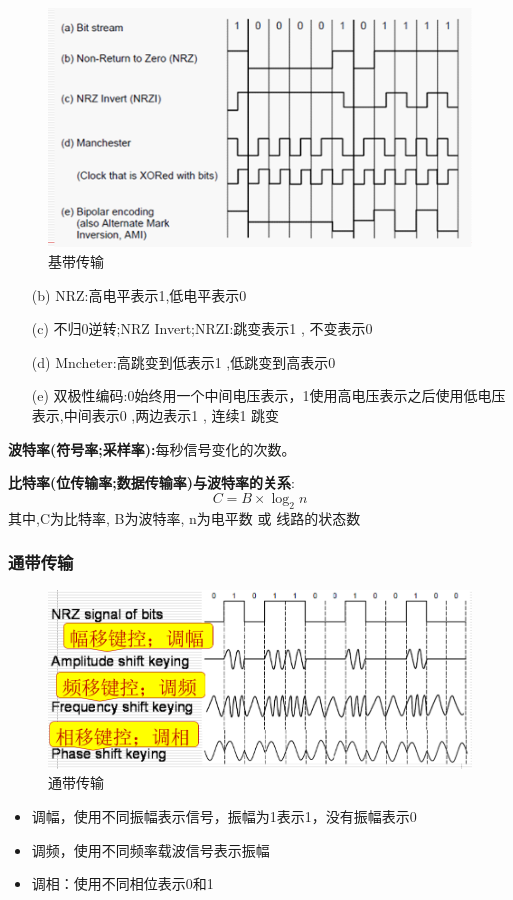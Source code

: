 \documentclass[UTF8,a4paper]{ctexart}
\begin{document}
  \begin{figure}[H]
    \centering
    \includegraphics[scale = 0.3]{assets/jisuanjiwangluo_cc3d9.png}
    \caption{基带传输}
  \end{figure}
  \begin{itemize}
    \item [(b)] NRZ:高电平表示1,低电平表示0
    \item [(c)] 不归0逆转;NRZ Invert;NRZI:跳变表示1 , 不变表示0
    \item [(d)] Mncheter:高跳变到低表示1 ,低跳变到高表示0
    \item [(e)] 双极性编码:0始终用一个中间电压表示，1使用高电压表示之后使用低电压表示,中间表示0 ,两边表示1 , 连续1 跳变
  \end{itemize}

  \textbf{波特率(符号率;采样率):}每秒信号变化的次数。

  \textbf{比特率(位传输率;数据传输率)与波特率的关系}:
  \[C = B \times \log_2 n\]
  其中,C为比特率, B为波特率, n为电平数 或 线路的状态数

  \subsubsection{通带传输}
  \begin{figure}[H]
    \centering
    \includegraphics[scale = 0.3]{assets/jisuanjiwangluo_2eccd.png}
    \caption{通带传输}
  \end{figure}
\begin{itemize}
  \item 调幅，使用不同振幅表示信号，振幅为1表示1，没有振幅表示0
  \item 调频，使用不同频率载波信号表示振幅
  \item 调相：使用不同相位表示0和1
\end{itemize}
\end{document}
